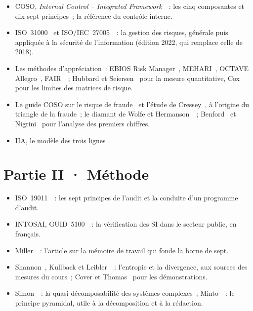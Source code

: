\begin{itemize}
    \item COSO, \emph{Internal Control -- Integrated Framework}~\cite{coso2013ic}~:
          les cinq composantes et dix-sept principes~; la référence du
          contrôle interne.
    \item ISO~31000~\cite{iso31000_2018} et ISO/IEC~27005~\cite{iso27005_2022}~:
          la gestion des risques, générale puis appliquée à la sécurité de
          l'information (édition 2022, qui remplace celle de 2018).
    \item Les méthodes d'appréciation~: EBIOS Risk
          Manager~\cite{anssi2018ebios}, MEHARI~\cite{clusif2010mehari},
          OCTAVE Allegro~\cite{caralli2007octave}, FAIR~\cite{freund2014fair}~;
          Hubbard et Seiersen~\cite{hubbard2016cyber} pour la mesure
          quantitative, Cox~\cite{cox2008matrices} pour les limites des
          matrices de risque.
    \item Le guide COSO sur le risque de fraude~\cite{coso2016fraude} et
          l'étude de Cressey~\cite{cressey1953}, à l'origine du triangle de
          la fraude~; le diamant de Wolfe et Hermanson~\cite{wolfe2004diamond}~;
          Benford~\cite{benford1938} et Nigrini~\cite{nigrini2012benford} pour
          l'analyse des premiers chiffres.
    \item IIA, le modèle des trois lignes~\cite{iia2020troislignes}.
\end{itemize}

\section*{Partie II · Méthode}

\begin{itemize}
    \item ISO~19011~\cite{iso19011_2018}~: les sept principes de l'audit et
          la conduite d'un programme d'audit.
    \item INTOSAI, GUID~5100~\cite{intosai2019guid5100}~: la vérification des
          SI dans le secteur public, en français.
    \item Miller~\cite{miller1956}~: l'article sur la mémoire de travail qui
          fonde la borne de sept.
    \item Shannon~\cite{shannon1948}, Kullback et Leibler~\cite{kullback1951}~:
          l'entropie et la divergence, aux sources des mesures du cours~; Cover et
          Thomas~\cite{cover2006elements} pour les démonstrations.
    \item Simon~\cite{simon1962complexity}~: la quasi-décomposabilité des
          systèmes complexes~; Minto~\cite{minto2009pyramid}~: le principe
          pyramidal, utile à la décomposition et à la rédaction.
\end{itemize}

